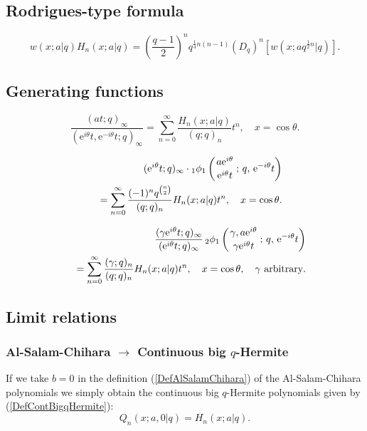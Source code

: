 \documentclass[envcountchap,graybox]{svmono}
\newcommand{\qhyp}[5]{\mbox{}_{#1}{\phi}_{#2}
\left(\genfrac{}{}{0pt}{}{#3}{#4}\,;\,q,\,#5\right)}
\newcommand{\e}{\textrm{e}}
\begin{document}
\subsection*{Rodrigues-type formula}
\begin{equation}
\label{RodContBigqHermite}
w(x;a|q)H_n(x;a|q)=\left(\frac{q-1}{2}\right)^nq^{\frac{1}{4}n(n-1)}
\left(D_q\right)^n\left[w(x;aq^{\frac{1}{2}n}|q)\right].
\end{equation}

\subsection*{Generating functions}
\begin{equation}
\label{GenContBigqHermite1}
\frac{(at;q)_{\infty}}{(\e^{i\theta}t,\e^{-i\theta}t;q)_{\infty}}
=\sum_{n=0}^{\infty}\frac{H_n(x;a|q)}{(q;q)_n}t^n,\quad x=\cos\theta.
\end{equation}

\begin{eqnarray}
\label{GenContBigqHermite2}
& &(\e^{i\theta}t;q)_{\infty}\cdot\qhyp{1}{1}{a\e^{i\theta}}{\e^{i\theta}t}{\e^{-i\theta}t}\nonumber\\
& &{}=\sum_{n=0}^{\infty}\frac{(-1)^nq^{\binom{n}{2}}}{(q;q)_n}H_n(x;a|q)t^n,
\quad x=\cos\theta.
\end{eqnarray}

\begin{eqnarray}
\label{GenContBigqHermite3}
& &\frac{(\gamma\e^{i\theta}t;q)_{\infty}}{(\e^{i\theta}t;q)_{\infty}}\,
\qhyp{2}{1}{\gamma,a\e^{i\theta}}{\gamma\e^{i\theta}t}{\e^{-i\theta}t}\nonumber\\
& &{}=\sum_{n=0}^{\infty}\frac{(\gamma;q)_n}{(q;q)_n}H_n(x;a|q)t^n,
\quad x=\cos\theta,\quad\textrm{$\gamma$ arbitrary}.
\end{eqnarray}

\subsection*{Limit relations}

\subsubsection*{Al-Salam-Chihara $\rightarrow$ Continuous big $q$-Hermite}
If we take $b=0$ in the definition (\ref{DefAlSalamChihara}) of the Al-Salam-Chihara
polynomials we simply obtain the continuous big $q$-Hermite polynomials given by
(\ref{DefContBigqHermite}):
$$Q_n(x;a,0|q)=H_n(x;a|q).$$
\end{document}
